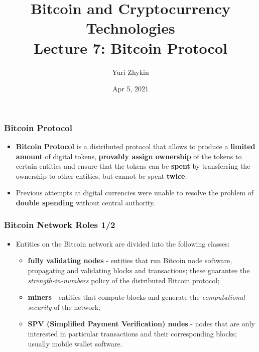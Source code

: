 \documentclass{beamer}
\title{
  Bitcoin and Cryptocurrency Technologies \\
  Lecture 7: Bitcoin Protocol
}
\author{Yuri Zhykin}
\date{Apr 5, 2021}
\begin{document}
\frame{\titlepage}

\begin{frame}
  \frametitle{Bitcoin Protocol}
  \begin{itemize}
  \item \textbf{Bitcoin Protocol} is a distributed protocol that allows to
    produce a \textbf{limited amount} of digital tokens, \textbf{provably assign
      ownership} of the tokens to certain entities and ensure that the tokens
    can be \textbf{spent} by transferring the ownership to other entities, but
    cannot be spent \textbf{twice}.
  \item Previous attempts at digital currencies were unable to resolve the
    problem of \textbf{double spending} without central authority.
  \end{itemize}
\end{frame}

\begin{frame}
  \frametitle{Bitcoin Network Roles 1/2}
  \begin{itemize}
  \item Entities on the Bitcoin network are divided into the following classes:
    \begin{itemize}
    \item \textbf{fully validating nodes} - entities that run Bitcoin node
      software, propagating and validating blocks and transactions; these
      guarantee the \textit{strength-in-numbers} policy of the distributed
      Bitcoin protocol;
    \item \textbf{miners} - entities that compute blocks and generate the
      \textit{computational security} of the network;
    \item \textbf{SPV (Simplified Payment Verification) nodes} - nodes that are
      only interested in particular transactions and their corresponding blocks;
      usually mobile wallet software.
    \end{itemize}
  \end{itemize}
\end{frame}
\end{document}
